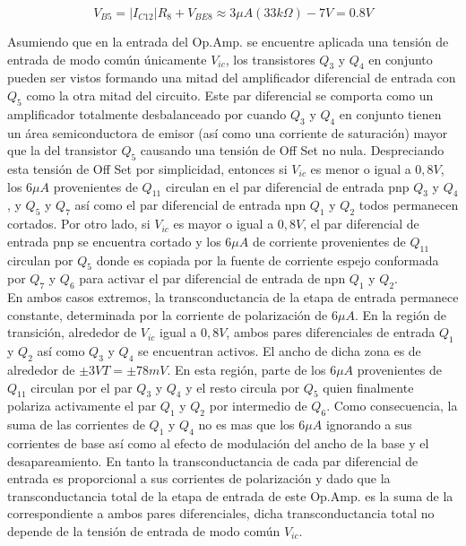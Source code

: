 \documentclass[12pt,a4paper,final,headinclude,footinclude,BCOR5mm]{scrartcl}
\begin{document}
\begin{equation}
V_{B5} = |I_{C12}|R_{8} + V_{BE8} \approx 3 \mu A (33 k \Omega) - 7V = 0.8V
\end{equation}

Asumiendo que en la entrada del Op.Amp. se encuentre aplicada una tensión de entrada de modo común únicamente $V_{ic}$, los transistores $Q_{3}$ y $Q_{4}$ en conjunto pueden ser vistos formando una mitad del amplificador diferencial de entrada con $Q_{5}$ como la otra mitad del circuito. Este par diferencial se comporta como un amplificador totalmente desbalanceado por cuando $Q_{3}$ y $Q_{4}$ en conjunto tienen un área semiconductora de emisor (así como una corriente de saturación) mayor que la del transistor $Q_{5}$ causando una tensión de Off Set no nula. Despreciando esta tensión de Off Set por simplicidad, entonces si $V_{ic}$ es menor o igual a $0,8 V$, los $6 \mu A$ provenientes de $Q_{11}$ circulan en el par diferencial de entrada pnp $Q_{3}$ y $Q_{4}$ , y $Q_{5}$ y $Q_{7}$ así como el par diferencial de entrada npn $Q_{1}$ y $Q_{2}$  todos permanecen cortados. Por otro lado, si $V_{ic}$ es mayor o igual a $0,8 V$, el par diferencial de entrada pnp se encuentra cortado y los $6 \mu A$ de corriente provenientes de $Q_{11}$ circulan por $Q_{5}$ donde es copiada por la fuente de corriente espejo conformada por $Q_{7}$ y $Q_{6}$  para activar el par diferencial de entrada de npn $Q_{1}$ y $Q_{2}$.\\

En ambos casos extremos, la transconductancia de la etapa de entrada permanece constante, determinada por la corriente de polarización de $6 \mu A$. En la región de transición, alrededor de $V_{ic}$  igual a $0,8 V$, ambos pares diferenciales de entrada $Q_{1}$ y $Q_{2}$  así como $Q_{3}$ y $Q_{4}$  se encuentran activos. El ancho de dicha zona es de alrededor de $\pm 3 VT = \pm 78 mV$. En esta región, parte de los $6 \mu A$ provenientes de $Q_{11}$ circulan por el par  $Q_{3}$ y $Q_{4}$  y el resto circula por $Q_{5}$ quien finalmente polariza activamente el par $Q_{1}$ y $Q_{2}$ por intermedio de $Q_{6}$. Como consecuencia, la suma de las corrientes de $Q_{1}$ y $Q_{4}$ no es mas que los $6 \mu A$ ignorando a sus corrientes de base así como al efecto de modulación del ancho de la base y el desapareamiento. En tanto la transconductancia de cada par diferencial de entrada es proporcional a sus corrientes de polarización y dado que la transconductancia total de la etapa de entrada de este Op.Amp. es la suma de la correspondiente a ambos pares diferenciales, dicha transconductancia total no depende de la tensión de entrada de modo común $V_{ic}$.\\
\end{document}
